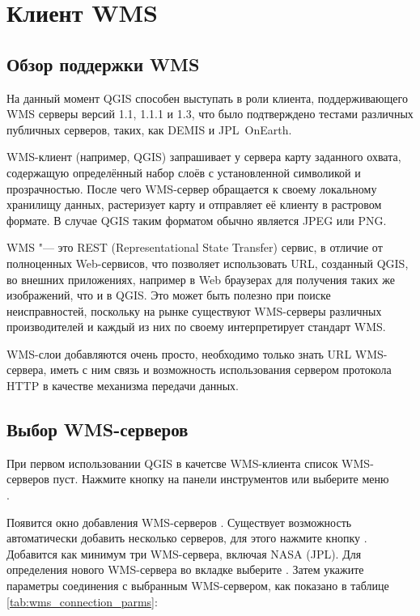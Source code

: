\section{Клиент WMS}\label{sec:ogc-wms}

\subsection{Обзор поддержки WMS}\label{sec:ogc-wms-about}

На данный момент QGIS способен выступать в роли клиента, поддерживающего WMS
серверы версий 1.1, 1.1.1 и 1.3, что было подтверждено тестами различных
публичных серверов, таких, как DEMIS и JPL~OnEarth.

WMS-клиент (например, QGIS) запрашивает у сервера карту заданного
охвата, содержащую определённый набор слоёв с установленной символикой и
прозрачностью. После чего WMS-сервер обращается к своему локальному хранилищу
данных, растеризует карту и отправляет её клиенту в растровом формате. В
случае QGIS таким форматом обычно является JPEG или PNG.

WMS "--- это REST (Representational State Transfer) сервис, в отличие от
полноценных Web-сервисов, что позволяет использовать URL, созданный QGIS,
во внешних приложениях, например в Web браузерах для получения таких же
изображений, что и в QGIS. Это может быть полезно при поиске неисправностей,
поскольку на рынке существуют WMS-серверы различных производителей и каждый
из них по своему интерпретирует стандарт WMS.

WMS-слои добавляются очень просто, необходимо только знать URL WMS-сервера,
иметь с ним связь и возможность использования сервером протокола HTTP в
качестве механизма передачи данных.

\subsection{Выбор WMS-серверов}\label{sec:ogc-wms-servers}

При первом использовании QGIS в качетсве WMS-клиента список WMS-серверов пуст.
Нажмите кнопку  на панели
инструментов или выберите меню  \arrow \\
.

Появится окно добавления WMS-серверов .
Существует возможность автоматически добавить несколько серверов, для
этого нажмите кнопку . Добавится как минимум три
WMS-сервера, включая NASA (JPL). Для определения нового WMS-сервера
во вкладке  выберите . Затем укажите
параметры соединения с выбранным WMS-сервером, как показано в таблице
\ref{tab:wms_connection_parms}:

